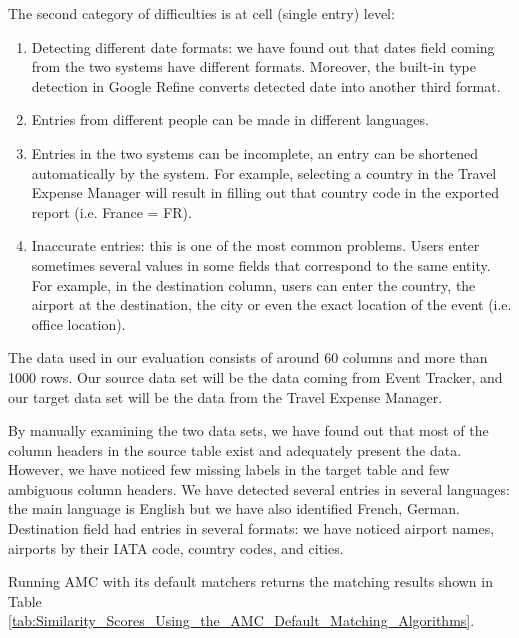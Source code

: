 \documentclass{../../Util/LaTEX/sig-alternate}
\begin{document}
The second category of difficulties is at cell (single entry) level:

\begin{enumerate}
\item  Detecting different date formats: we have found out that dates field coming from the two systems have different formats. Moreover, the built-in type detection in Google Refine converts detected date into another third format.

\item  Entries from different people can be made in different languages.

\item  Entries in the two systems can be incomplete, an entry can be shortened automatically by the system. For example, selecting a country in the Travel Expense Manager will result in filling out that country code in the exported report (i.e. France = FR).

\item  Inaccurate entries: this is one of the most common problems. Users enter sometimes several values in some fields that correspond to the same entity. For example, in the destination column, users can enter the country, the airport at the destination, the city or even the exact location of the event (i.e. office location).
\end{enumerate}

The data used in our evaluation consists of around 60 columns and more than 1000 rows. Our source data set will be the data coming from Event Tracker, and our target data set will be the data from the Travel Expense Manager.

By manually examining the two data sets, we have found out that most of the column headers in the source table exist and adequately present the data. However, we have noticed few missing labels in the target table and few ambiguous column headers. We have detected several entries in several languages: the main language is English but we have also identified French, German. Destination field had entries in several formats: we have noticed airport names, airports by their IATA code, country codes, and cities.

Running AMC with its default matchers returns the matching results shown in Table \ref{tab:Similarity_Scores_Using_the_AMC_Default_Matching_Algorithms}.
\end{document}
